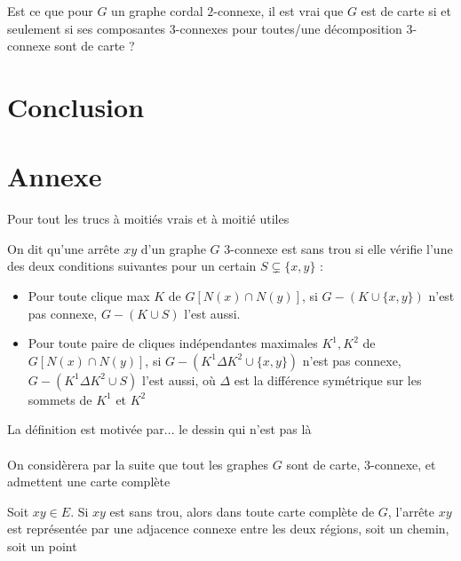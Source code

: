 \documentclass{scrartcl}
\begin{document}
\begin{flushleft}
\begin{quest}
    Est ce que pour $G$ un graphe cordal $2$-connexe, il est vrai que $G$ est de carte si et seulement si ses composantes $3$-connexes pour
    toutes/une décomposition $3$-connexe sont de carte ?
\end{quest}

\section*{Conclusion}

\section*{Annexe}

Pour tout les trucs à moitiés vrais et à moitié utiles


\begin{def*}
    On dit qu'une arrête $xy$ d'un graphe $G$ $3$-connexe est sans trou si elle vérifie l'une des deux conditions suivantes pour un certain
    $S \subsetneq \{x, y\}$ :
    \begin{itemize}
        \item Pour toute clique max $K$ de $G[N(x) \cap N(y)]$, si $G - (K \cup \{x,y\})$ n'est pas connexe, $G - (K \cup S)$ l'est aussi.
        \item Pour toute paire de cliques indépendantes maximales $K^1, K^2$ de $G[N(x) \cap N(y)]$, si $G - (K^1 \Delta K^2 \cup \{x,y\})$ n'est pas connexe,
        $G - (K^1 \Delta K^2 \cup S)$ l'est aussi, où $\Delta$ est la différence symétrique sur les sommets de $K^1$ et $K^2$
    \end{itemize}
\end{def*}

La définition est motivée par... le dessin qui n'est pas là
\\~\\
On considèrera par la suite que tout les graphes $G$ sont de carte, $3$-connexe, et admettent une carte complète

\begin{lem}\label{contrSanstrou}
    Soit $xy \in E$. Si $xy$ est sans trou, alors dans toute carte complète de $G$, l'arrête $xy$ est représentée par une adjacence
    connexe entre les deux régions, soit un chemin, soit un point
\end{lem}


\end{flushleft}
\end{document}
